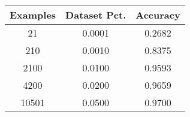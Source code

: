 \begin{tabular}{ccc}
\toprule
 Examples &  Dataset Pct. &  Accuracy \\
\midrule
       21 &        0.0001 &    0.2682 \\
      210 &        0.0010 &    0.8375 \\
     2100 &        0.0100 &    0.9593 \\
     4200 &        0.0200 &    0.9659 \\
    10501 &        0.0500 &    0.9700 \\
\bottomrule
\end{tabular}
